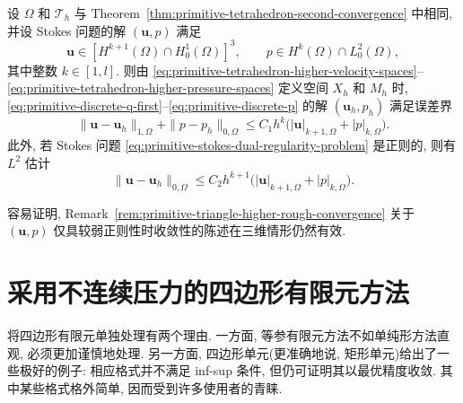 
\setcounter{statement}{5}
\renewcommand{\theHstatement}{theorem.\thesection.\arabic{statement}}
\begin{Theorem}\label{thm:primitive-tetrahedron-higher-convergence}
设 $\Omega$ 和 $\mathcal T_h$ 与 Theorem~\ref{thm:primitive-tetrahedron-second-convergence}
中相同, 并设 Stokes 问题的解 $(\mathbf u,p)$ 满足
\[
\mathbf u\in[H^{k+1}(\Omega)\cap H_0^1(\Omega)]^3,
\qquad p\in H^k(\Omega)\cap L_0^2(\Omega),
\]
其中整数 $k\in[1,l]$. 则由
\eqref{eq:primitive-tetrahedron-higher-velocity-spaces}--
\eqref{eq:primitive-tetrahedron-higher-pressure-spaces} 定义空间 $X_h$ 和 $M_h$
时, \eqref{eq:primitive-discrete-q-first}--\eqref{eq:primitive-discrete-p}
的解 $(\mathbf u_h,p_h)$ 满足误差界
\begin{equation}\label{eq:primitive-tetrahedron-higher-h1-error}
\|\mathbf u-\mathbf u_h\|_{1,\Omega}
+\|p-p_h\|_{0,\Omega}
\leq C_1h^k\bigl(|\mathbf u|_{k+1,\Omega}+|p|_{k,\Omega}\bigr).
\end{equation}
此外, 若 Stokes 问题 \eqref{eq:primitive-stokes-dual-regularity-problem}
是正则的, 则有 $L^2$ 估计
\begin{equation}\label{eq:primitive-tetrahedron-higher-l2-error}
\|\mathbf u-\mathbf u_h\|_{0,\Omega}
\leq C_2h^{k+1}\bigl(|\mathbf u|_{k+1,\Omega}+|p|_{k,\Omega}\bigr).
\end{equation}
\end{Theorem}

\setcounter{statement}{7}
\renewcommand{\theHstatement}{remark.\thesection.\arabic{statement}}
\begin{Remark}\label{rem:primitive-tetrahedron-weak-regularity}
容易证明, Remark~\ref{rem:primitive-triangle-higher-rough-convergence}
关于 $(\mathbf u,p)$ 仅具较弱正则性时收敛性的陈述在三维情形仍然有效.
\end{Remark}

\section{采用不连续压力的四边形有限元方法}
\label{sec:primitive-quadrilateral-discontinuous-pressure}

将四边形有限元单独处理有两个理由. 一方面, 等参有限元方法不如单纯形方法直观,
必须更加谨慎地处理. 另一方面, 四边形单元(更准确地说, 矩形单元)给出了一些极好的例子:
相应格式并不满足 inf-sup 条件, 但仍可证明其以最优精度收敛. 其中某些格式格外简单,
因而受到许多使用者的青睐.

